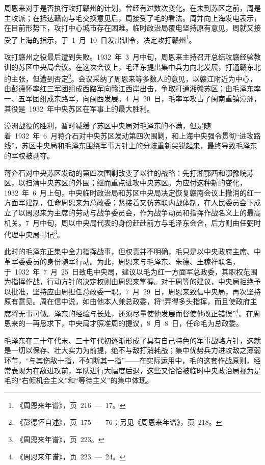 周恩来对于是否执行攻打赣州的计划，曾经有过数次变化。在未到苏区之前，周是主攻派；在抵达赣南与毛交换意见后，周接受了毛的看法。周并向上海发电表示，在目前形势下，攻打中心城市存在困难。临时政治局覆电坚持原有意见，周就又接受了上海的指示，于~1~月~10~日发出训令，决定攻打赣州\footnote{《周恩来年谱》，页~216~—~17。}。

攻打赣州之役最后遭到失败。1932~年~3~月中旬，周恩来主持召开总结攻赣经验教训的苏区中央局会议。在这次会议上，毛泽东提出集中兵力向北发展，打通赣东北的主张，但遭到否定\footnote{《彭德怀自述》，页~175~—~76；另见《周恩来年谱》，页~218。}。会议采纳了周恩来等多数人的意见，以赣江附近为中心，由彭德怀率红三军团组成西路军向赣江西岸出击，争取打通湘赣苏区；由毛泽东率一、五军团组成东路军，向闽西发展。4~月~20~日，毛率军攻占了闽南重镇漳洲，其役是~1932~年中央苏区在军事上的最大胜利。

漳洲战役的胜利，暂时减缓了苏区中央局对毛泽东的不满，但是随着~1932~年~6~月蒋介石对中央苏区发动第四次围剿，和上海中央强令贯彻“进攻路线”，苏区中央局和毛泽东围绕军事方针上的分歧重新尖锐起来，最终导致毛泽东的军权被剥夺。

蒋介石对中央苏区发动的第四次围剿改变了以往的战略：先打湘鄂西和鄂豫皖苏区，以扫清中央苏区的外围；继而重点进攻中央苏区。为应付这种新的变化，1932~年~6~月上旬，中央临时政治局和苏区中央局决定恢复赣南会议上撤消的红一方面军建制，任命周恩来为总政委；紧接着又仿苏联内战体制，在人民委员会下成立了以周恩来为主席的劳动与战争委员会，作为战争动员和指挥作战名义上的最高机关。7~月中旬，周以中央局代表的身份赶赴前方与毛泽东会合，后方则由任弼时代理中央局书记\footnote{《周恩来年谱》，页~223。}。

此时的毛泽东正集中全力指挥战事，但权责并不明确，毛只是以中央政府主席、中革军委委员的身份随军行动。为此，周恩来与毛泽东、朱德、王稼祥联名，于~1932~年~7~月~25~日致电中央局，建议以毛为红一方面军总政委，其职权范围为指挥作战，行动方针的决定权则由周恩来掌握。对于周等的建议，中央局拒绝予以批准，坚持应由周担任总政委一职。7~月~29~日，周恩来致信中央局，再次坚持原有意见。周在信中说，如由他本人兼总政委，将“弄得多头指挥，而且使政府主席将无事可做。泽东的经验与长处，还须尽量使他发展而督使他改正错误”\footnote{《周恩来年谱》，页~223~—~24。}。在周恩来的一再恳求下，中央局才照准周的提议，8~月~8~日，任命毛为总政委。

毛泽东在二十年代末、三十年代初逐渐形成了具有自己特色的军事战略方针，这就是一切以保存、壮大实力为前提，绝不与敌打消耗战；集中优势兵力进攻敌之薄弱环节，“与其伤敌十指，不如断其一指”——在实际运用中，毛的这套作战原则，经常表现为在敌进攻前，军队进行大幅度后退，这些又恰恰被临时中央政治局视为是毛的“右倾机会主义”和“等待主义”的集中体现。

